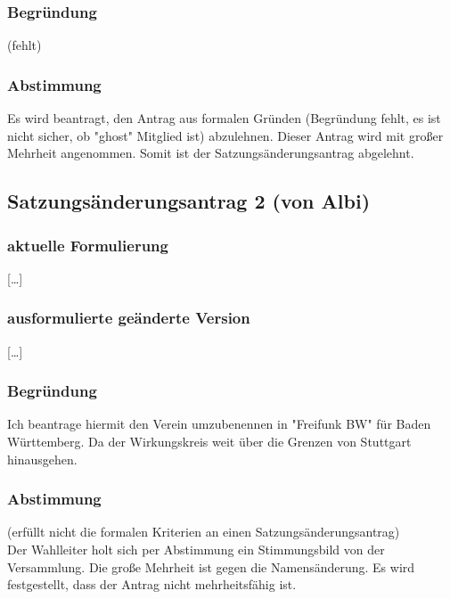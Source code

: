\documentclass[a4paper]{scrartcl}
\begin{document}
\subsubsection{Begründung}

(fehlt)

\subsubsection{Abstimmung}

Es wird beantragt, den Antrag aus formalen Gründen (Begründung fehlt, es ist nicht sicher, ob "ghost" Mitglied ist) abzulehnen. Dieser Antrag wird mit großer Mehrheit angenommen. Somit ist der Satzungsänderungsantrag abgelehnt.

\subsection{Satzungsänderungsantrag 2 (von Albi)}
\subsubsection{aktuelle Formulierung}

{[}\dots{]}\\

\subsubsection{ausformulierte geänderte Version}

{[}\dots{]}\\

\subsubsection{Begründung}

Ich beantrage hiermit den Verein umzubenennen in "Freifunk BW" für Baden Württemberg.
Da der Wirkungskreis weit über die Grenzen von Stuttgart hinausgehen.

\subsubsection{Abstimmung}

(erfüllt nicht die formalen Kriterien an einen Satzungsänderungsantrag)\\

Der Wahlleiter holt sich per Abstimmung ein Stimmungsbild von der Versammlung. Die große Mehrheit ist gegen die Namensänderung.
Es wird festgestellt, dass der Antrag nicht mehrheitsfähig ist.
\end{document}
